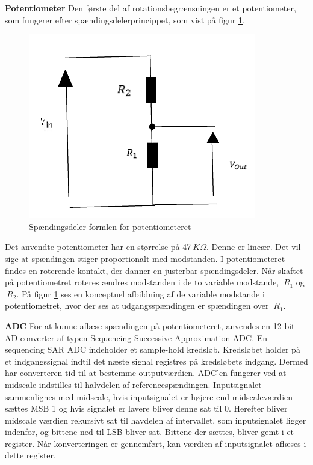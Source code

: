 \noindent \textbf{Potentiometer} \newline
\noindent Den første del af rotationsbegrænsningen er et potentiometer, som fungerer efter spændingsdelerprincippet, som vist på figur \ref{fig:potentiometer2}.

\begin{figure}[H]
	\centering
	\includegraphics[scale=0.65]{DesignOgImplementering/images/potentiometer}
	\caption{Spændingsdeler formlen for potentiometeret}
	\label{fig:potentiometer2}
\end{figure}

\noindent Det anvendte potentiometer har en størrelse på 47\(\ K\Omega\). Denne er lineær. Det vil sige at spændingen stiger proportionalt med modstanden. I potentiometeret findes en roterende kontakt, der danner en justerbar spændingsdeler. Når skaftet på potentiometret roteres ændres modstanden i de to variable modstande, \(\ R_{1}\) og  \(\ R_{2}\). På figur \ref{fig:potentiometer2} ses en konceptuel afbildning af de variable modstande i potentiometret, hvor der ses at udgangsspændingen er spændingen over \(\ R_{1}\). \newline

\noindent \textbf{ADC} \newline
For at kunne aflæse spændingen på potentiometeret, anvendes en 12-bit AD converter af typen Sequencing Successive Approximation ADC. En sequencing SAR ADC indeholder et sample-hold kredsløb. Kredsløbet holder på et indgangssignal indtil det næste signal registres på kredsløbets indgang. Dermed har converteren tid til at bestemme outputværdien. \newline \newline
\noindent ADC'en fungerer ved at midscale indstilles til halvdelen af referencespændingen. Inputsignalet sammenlignes med midscale, hvis inputsignalet er højere end midscaleværdien sættes MSB 1 og hvis signalet er lavere bliver denne sat til 0. Herefter bliver midscale værdien rekursivt sat til havdelen af intervallet, som inputsignalet ligger indenfor, og bittene ned til LSB bliver sat. Bittene der sættes, bliver gemt i et register. Når konverteringen er gennemført, kan værdien af inputsignalet aflæses i dette register. 

